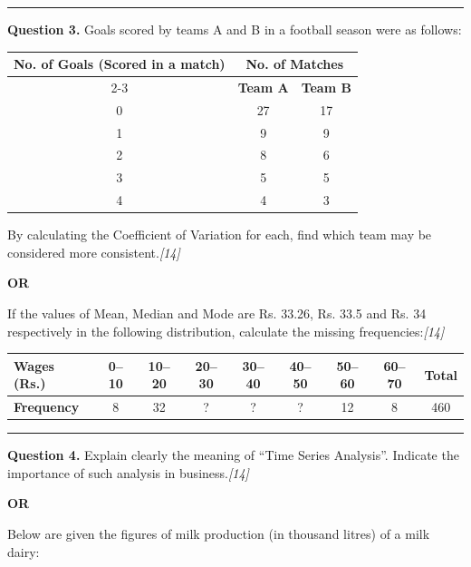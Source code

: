 \documentclass[11pt,a4paper]{article}
\newcommand{\pts}[1]{\hfill   \textit{[#1]}}
\begin{document}
\medskip\rule{\linewidth}{0.2pt}




\noindent   \textbf{Question 3.}
Goals scored by teams A and B in a football season were as follows:

\begin{center}
  \renewcommand{\arraystretch}{1.2}
  
\begin{tabular}{|c|c|c|}
    \hline
   \textbf{No. of Goals (Scored in a match)} & \multicolumn{2}{c|}{   \textbf{No. of Matches}} \\ \cline{2-3}
    &   \textbf{Team A} &   \textbf{Team B} \\ \hline
    0 & 27 & 17 \\ \hline
    1 & 9 & 9 \\ \hline
    2 & 8 & 6 \\ \hline
    3 & 5 & 5 \\ \hline
    4 & 4 & 3 \\ \hline
  \end{tabular}
\end{center}
By calculating the Coefficient of Variation for each, find which team may be considered more consistent.\pts{14}

\centerline{   \textbf{OR}}

If the values of Mean, Median and Mode are Rs. 33.26, Rs. 33.5 and Rs. 34 respectively in the following distribution, calculate the missing frequencies:\pts{14}

\begin{center}
  \renewcommand{\arraystretch}{1.2}
  
\begin{tabular}{|l|c|c|c|c|c|c|c|c|}
    \hline
   \textbf{Wages (Rs.)} & 0--10 & 10--20 & 20--30 & 30--40 & 40--50 & 50--60 & 60--70 &   \textbf{Total} \\ \hline
   \textbf{Frequency} & 8 & 32 & ? & ? & ? & 12 & 8 & 460 \\ \hline
  \end{tabular}
\end{center}

\medskip\rule{\linewidth}{0.2pt}




\noindent   \textbf{Question 4.}
Explain clearly the meaning of ``Time Series Analysis''. Indicate the importance of such analysis in business.\pts{14}

\centerline{   \textbf{OR}}

Below are given the figures of milk production (in thousand litres) of a milk dairy:
\end{document}
